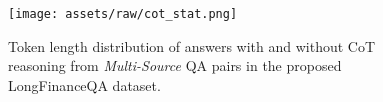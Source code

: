 \begin{figure}
    \centering
    \texttt{[image: assets/raw/cot\_stat.png]} \vspace{-3mm}
    \caption{Token length distribution of answers with and without CoT reasoning from \textit{Multi-Source} QA pairs in the proposed LongFinanceQA dataset.} \label{fig:cot_stat} \vspace{-3mm}
\end{figure}